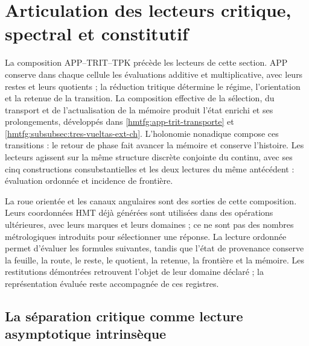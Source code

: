 \section{Articulation des lecteurs critique, spectral et constitutif}
\label{hmtfg:articulacion:seccion}

La composition APP--TRIT--TPK précède les lecteurs de cette section.
APP conserve dans chaque cellule les évaluations additive et multiplicative,
avec leurs restes et leurs quotients ; la réduction tritique détermine le régime,
l’orientation et la retenue de la transition. La composition effective
de la sélection, du transport et de l’actualisation de la mémoire produit l’état
enrichi et ses prolongements, développés dans
\ref{hmtfg:app-trit-transporte} et
\ref{hmtfg:subsubsec:tres-vueltas-ext-ch}.
L’holonomie nonadique compose ces transitions : le retour de phase
fait avancer la mémoire et conserve l’histoire. Les lecteurs agissent sur la
même structure discrète conjointe du continu, avec ses cinq
constructions consubstantielles et les deux lectures du même
antécédent : évaluation ordonnée et incidence de frontière.

La roue orientée et les canaux angulaires sont des sorties de cette
composition. Leurs coordonnées HMT déjà générées sont utilisées dans des opérations
ultérieures, avec leurs marques et leurs domaines ; ce ne sont pas des nombres métrologiques
introduits pour sélectionner une réponse. La lecture ordonnée
permet d’évaluer les formules suivantes, tandis que l’état de provenance
conserve la feuille, la route, le reste, le quotient, la retenue, la frontière et la mémoire.
Les restitutions démontrées retrouvent l’objet de leur domaine
déclaré ; la représentation évaluée reste accompagnée de ces
registres.

\subsection{La séparation critique comme lecture asymptotique intrinsèque}
\label{hmtfg:articulacion:separacion}

